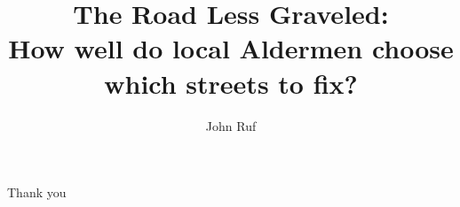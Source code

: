 \documentclass[11pt,notes=hide,aspectratio=169,mathserif]{beamer}
\title[The Road Less Graveled: How well do local Aldermen choose which streets to fix?]{The Road Less Graveled:\\ How well do local Aldermen choose which streets to fix?}
\author[John Ruf]{John Ruf}
\date{\monthname[\the\month] \the\year}
\begin{document}
\begin{frame}[plain]
\titlepage
\note{
	\begin{itemize}
	\end{itemize}
}
\end{frame}





\begin{frame}[plain]
\begin{center}{\LARGE Thank you}\end{center}
\end{frame}


%

%
\end{document}
